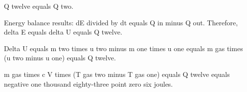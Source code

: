 Q twelve equals Q two.  

Energy balance results:  
dE divided by dt equals Q in minus Q out.  
Therefore, delta E equals delta U equals Q twelve.  

Delta U equals m two times u two minus m one times u one equals m gas times (u two minus u one) equals Q twelve.  

m gas times c V times (T gas two minus T gas one) equals Q twelve equals negative one thousand eighty-three point zero six joules.
